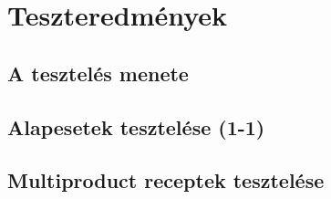 \chapter{Teszteredmények}
\section{A tesztelés menete}
\section{Alapesetek tesztelése (1-1)}
\section{Multiproduct receptek tesztelése}